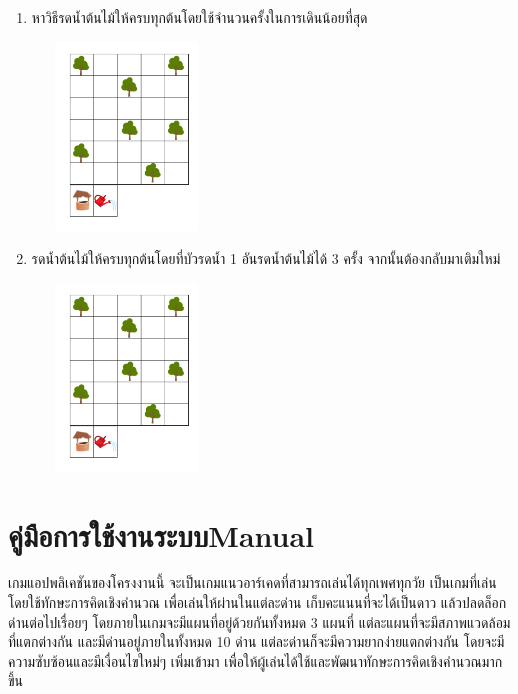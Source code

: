 \begin{enumerate}
\begin{center}
    \end{center}
    \item หาวิธีรดน้ำต้นไม้ให้ครบทุกต้นโดยใช้จำนวนครั้งในการเดินน้อยที่สุด
    \begin{center}
        \includegraphics[width=5cm, height=5cm]{pic-toro/exam/treemed.png}
    \end{center}
    \item รดน้ำต้นไม้ให้ครบทุกต้นโดยที่บัวรดน้ำ 1 อันรดน้ำต้นไม้ได้ 3 ครั้ง จากนั้นต้องกลับมาเติมใหม่
    \begin{center}
        \includegraphics[width=5cm, height=5cm]{pic-toro/exam/treehard.png}
    \end{center} 
\end{enumerate}

\chapter{\ifcpe คู่มือการใช้งานระบบ\else Manual\fi}

เกมแอปพลิเคชันของโครงงานนี้ จะเป็นเกมแนวอาร์เคดที่สามารถเล่นได้ทุกเพศทุกวัย 
เป็นเกมที่เล่นโดยใช้ทักษะการคิดเชิงคำนวณ เพื่อเล่นให้ผ่านในแต่ละด่าน เก็บคะแนนที่จะได้เป็นดาว แล้วปลดล็อกด่านต่อไปเรื่อยๆ 
โดยภายในเกมจะมีแผนที่อยู่ด้วยกันทั้งหมด 3 แผนที่ แต่ละแผนที่จะมีสภาพแวดล้อมที่แตกต่างกัน และมีด่านอยู่ภายในทั้งหมด 10 
ด่าน แต่ละด่านก็จะมีความยากง่ายแตกต่างกัน โดยจะมีความซับซ้อนและมีเงื่อนไขใหม่ๆ
เพิ่มเข้ามา เพื่อให้ผู้เล่นได้ใช้และพัฒนาทักษะการคิดเชิงคำนวณมากขึ้น


